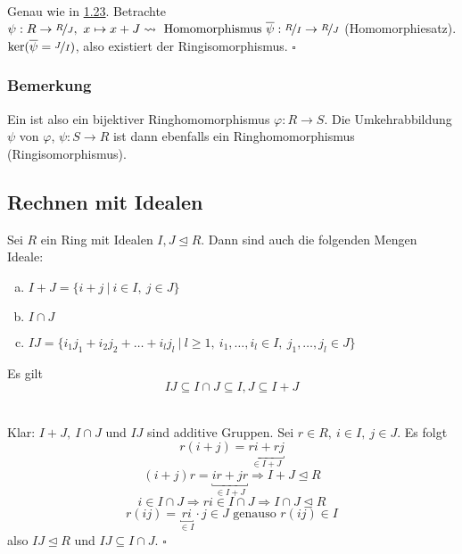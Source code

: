 \\
Genau wie in \hyperref[sub:isomorphiesaetze]{1.23}. 
Betrachte $\psi:R\to\nicefrac{R}{J},~x\mapsto x+J \rightsquigarrow \text{ Homomorphismus }\overline{\psi}:\nicefrac{R}{I}\to\nicefrac{R}{J}$ (Homomorphiesatz). 
$\ker(\overline{\psi}=\nicefrac{J}{I})$, also existiert der Ringisomorphismus.
\hfill $\square$

\subsubsection*{Bemerkung}
Ein  ist also ein bijektiver Ringhomomorphismus $\varphi:R\to S$. 
Die Umkehrabbildung $\psi$ von $\varphi$, $\psi:S\to R$ ist dann ebenfalls ein Ringhomomorphismus (Ringisomorphismus).


\subsection{Rechnen mit Idealen}
\label{sub:rechnen_ideale}
Sei $R$ ein Ring mit Idealen $I,J\trianglelefteq R$. 
Dann sind auch die folgenden Mengen Ideale:
\begin{enumerate}[(a)]
	\item $I+J=\{i+j~|~i\in I,~j\in J\}$
	\item $I\cap J$
	\item $IJ=\{i_1j_1+i_2j_2+\dots+i_lj_l~|~l\ge 1,~i_1,\dots,i_l\in I,~j_1,\dots,j_l\in J \}$
\end{enumerate}
Es gilt
\[
IJ\subseteq I\cap J\subseteq I,J\subseteq I+J
\]

\\
Klar: $I+J,~I\cap J$ und $IJ$ sind additive Gruppen.
Sei $r\in R,~i\in I,~j\in J$. 
Es folgt
\[
r(i+j)=\underbracket{ri+rj}_{\in I+J}
\]
\[
(i+j)r=\underbracket{ir+jr}_{\in I+J}\Rightarrow I+J\trianglelefteq R
\]
\[
i\in I\cap J \Rightarrow ri\in I\cap J\Rightarrow I\cap J\trianglelefteq R
\]
\[
r(ij)=\underbracket{ri}_{\in I}\cdot j\in J \text{ genauso } r(ij)\in I
\]
also $IJ\trianglelefteq R$ und $IJ\subseteq I\cap J$.
\hfill $\square$

